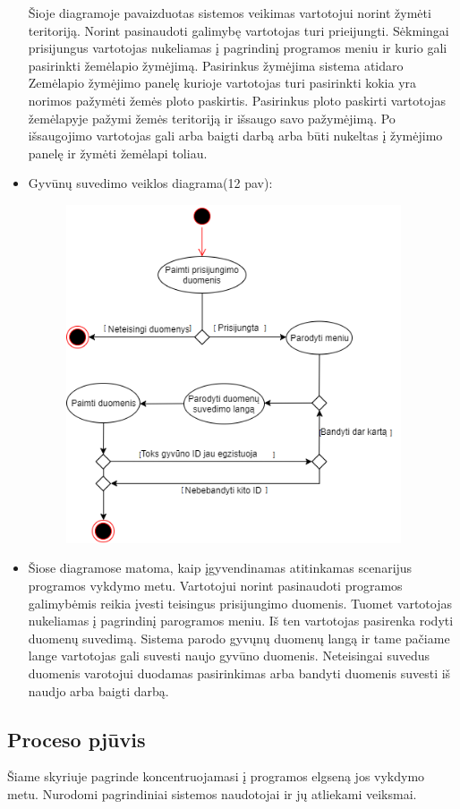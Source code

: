 \documentclass[oneside]{VUMIFPSkursinis}
\begin{document}
\begin{itemize}
Šioje diagramoje pavaizduotas sistemos veikimas vartotojui norint žymėti teritoriją. Norint pasinaudoti galimybę vartotojas turi prieijungti. Sėkmingai prisijungus vartotojas nukeliamas į pagrindinį programos meniu ir kurio gali pasirinkti žemėlapio žymėjimą. Pasirinkus žymėjima sistema atidaro Zemėlapio žymėjimo panelę kurioje vartotojas turi pasirinkti kokia yra norimos pažymėti žemės ploto paskirtis. Pasirinkus ploto paskirti vartotojas žemėlapyje pažymi žemės teritoriją ir išsaugo savo pažymėjimą. Po išsaugojimo vartotojas gali arba baigti darbą arba būti nukeltas į žymėjimo panelę ir žymėti žemėlapi toliau.
\item Gyvūnų suvedimo veiklos diagrama(12 pav):
	\begin{figure}[H]
	\centering	
	\includegraphics[width=10cm,height=10cm,keepaspectratio]{VeiklosGyvunuSuvedimas.png}
	\caption{}
	\label{}
	\end{figure}
\item Šiose diagramose matoma, kaip įgyvendinamas atitinkamas scenarijus programos vykdymo metu. Vartotojui norint pasinaudoti programos galimybėmis reikia įvesti teisingus prisijungimo duomenis. Tuomet vartotojas nukeliamas į pagrindinį parogramos meniu. Iš ten vartotojas pasirenka rodyti duomenų suvedimą. Sistema parodo gyvųnų duomenų langą ir tame pačiame lange vartotojas gali suvesti naujo gyvūno duomenis. Neteisingai suvedus duomenis varotojui duodamas pasirinkimas arba bandyti duomenis suvesti iš naudjo arba baigti darbą.
\end{itemize}
\pagebreak

\subsection{Proceso pjūvis}
Šiame skyriuje pagrinde koncentruojamasi į programos elgseną jos vykdymo metu. Nurodomi pagrindiniai sistemos naudotojai ir jų atliekami veiksmai.
\end{document}
